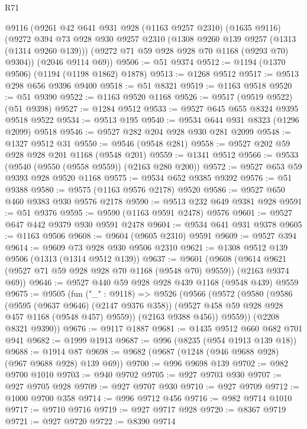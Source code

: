 \begin{lexlean}{R71}
\begin{coremodule}
    @9116
    (@9261
      @42
      @641
      @931
      @928
      (@1163 @9257 @2310)
      (@1635 @9116)
      (@9272
        @394
        @73
        @928
        @930
        @9257
        @2310
        (@1308 @9260 @139 @9257 (@1313 (@1314 @9260 @139)))
        (@9272 @71 @59 @928 @928 @70 @1168 (@9293 @70) @9304))
      (@2046 @9114 @69))
@9506 := @51 @9374
@9512 := @1194 (@1370 @9506) (@1194 (@1198 @1862) @1878)
@9513 := @1268 @9512
@9517 := @9513 @298 @656 @9396 @9400
@9518 := @51 @8321
@9519 := @1163 @9518
@9520 := @51 @9390
@9522 := @1163 @9520 @1168
@9526 := @9517 (@9519 @9522) (@51 @9398)
@9527 := @1284 @9512
@9533 := @9527 @645 @655 @8324 @9395 @9518 @9522
@9534 := @9513 @195
@9540 := @9534 @644 @931 @8323 (@1296 @2099) @9518
@9546 := @9527 @282 @204 @928 @930 @281 @2099
@9548 := @1327 @9512 @31
@9550 := @9546 (@9548 @281)
@9558 := @9527 @202 @59 @928 @928 @201 @1168 (@9548 @201)
@9559 := @1341 @9512
@9566 := @9533 (@9540 (@9550 (@9558 @9559)) (@2163 @280 @200))
@9572 := @9527 @653 @59 @9393 @928 @9520 @1168
@9575 := @9534 @652 @9385 @9392
@9576 := @51 @9388
@9580 := @9575 (@1163 @9576 @2178) @9520
@9586 := @9527 @650 @460 @9383 @930 @9576 @2178
@9590 := @9513 @232 @649 @9381 @928
@9591 := @51 @9376
@9595 := @9590 (@1163 @9591 @2478) @9576
@9601 := @9527 @647 @442 @9379 @930 @9591 @2478
@9604 := @9534 @641 @931 @9378
@9605 := @1163 @9506
@9608 := @9604 (@9605 @2310) @9591
@9609 := @9527 @394
@9614 := @9609 @73 @928 @930 @9506 @2310
@9621 := @1308 @9512 @139 @9506 (@1313 (@1314 @9512 @139))
@9637 := @9601
    (@9608 (@9614 @9621 (@9527 @71 @59 @928 @928 @70 @1168 (@9548 @70) @9559)) (@2163 @9374 @69))
@9646 := @9527 @440 @59 @928 @928 @439 @1168 (@9548 @439) @9559
@9675 := @9505
    (fun ("_" : @9118) =>
    @9526
      (@9566
        (@9572
          (@9580
            (@9586
              (@9595 (@9637 @9646) (@2147 @9376 @358))
              (@9527 @458 @59 @928 @928 @457 @1168 (@9548 @457) @9559))
            (@2163 @9388 @456))
          @9559))
      (@2208 @8321 @9390))
@9676 := @9117 @1887
@9681 := @1435 @9512 @660 @682 @701 @941
@9682 := @1999 @1913
@9687 := @996 (@8235 (@954 @1913 @139 @18))
@9688 := @1914 @87
@9698 := @9682 (@9687 (@1248 (@946 @9688 @928) (@967 @9688 @928) @139 @69))
@9700 := @996 @9698 @139
@9702 := @982 @9700 @1010
@9703 := @940 @9702
@9705 := @927 @9703 @930
@9707 := @927 @9705 @928
@9709 := @927 @9707 @930
@9710 := @927 @9709
@9712 := @1000 @9700 @358
@9714 := @996 @9712 @456
@9716 := @982 @9714 @1010
@9717 := @9710 @9716
@9719 := @927 @9717 @928
@9720 := @8367 @9719
@9721 := @927 @9720
@9722 := @8390 @9714

\end{coremodule}
\end{lexlean}

